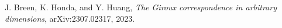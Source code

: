 \documentclass[11pt]{amsart}
\begin{document}
\begin{thebibliography}{}
\begin{comment}
\bibitem[BEHW03]{SFTCompactness}
F. Bourgeois, Y. Eliashberg, H. Hofer, and K. Wysocki, \textit{Compactness results in symplectic field theory}, Geom. Topol., Volume 7, Number 2, p.799-888, 2003.

\bibitem[BN10]{AlgebraicallyOvertwisted}
F. Bourgeois and K. Niederkr{\"u}ger, Towards a good definition of algebraically overtwisted,
Expo. Math. 28, no. 1, 85–100, 2010.

\bibitem[BO09a]{BO:MorseBott}
F. Bourgeois and A. Oancea, \textit{Symplectic homology, autonomous Hamiltonians, and Morse–Bott moduli spaces}, Duke Math. J. 146, p.71–174, 2009.

\bibitem[BO09b]{BO:ExactSequence}
F. Bourgeois and A. Oancea, \textit{An exact sequence for contact- and symplectic homology},
Invent. math., Volume 175, p. 611–680, 2009.

\bibitem[BT82]{BottTu}
R. Bott and L. R. Tu, \textit{Differential forms in algebraic topology}, Graduate Texts in Mathematics 82, Springer-Verlag, 1982.
\end{comment}

J. Breen, K. Honda, and Y. Huang, \textit{The Giroux correspondence in arbitrary dimensions}, arXiv:2307.02317, 2023.

\begin{comment}
\bibitem[CGKS14]{CGKS:Polyfilling}
C. Cao, N. Gallup, K. Hayden, J. M. Sabloff, \textit{Topologically Distinct Lagrangian and Symplectic Fillings}, Math. Research Letters, Vol. 21, p.85-99, 2014.

\begin{comment}
\bibitem[CMP19]{CMP:OT}
R. Casals, E. Murphy, and F. Presas, \textit{Geometric criteria for overtwistedness}, J. Amer. Math. Soc. 32, p.563–604, 2019.


\bibitem[CG86]{CG:Cobordisms}
A. Casson, C. M. Gordon, \textit{Cobordism of classical knots}, from: "{\'A} la recherche de la topologie perdue" (editors L Guillou, A Marin), Progr. Math. 62, Birkh{\"a}user 181, 1986.

\bibitem[CDGG20]{Cthulu}
B. Chantraine, G. Dimitroglou Rizell, P. Ghiggini, and R. Golovko, \textit{Floer theory for Lagrangian cobordisms}, J. Differential Geom. 114 no. 3, p.393–465, 2020.

\bibitem[Ch10]{Chantraine:Concordance}
B. Chantraine, \textit{Lagrangian concordance of Legendrian knots}, Algebr. Geom. Topol. 10, p.63-85, 2010.

\bibitem[Ch10]{Chantraine:Symmetric}
B. Chantraine, \textit{Lagrangian concordance is not a symetric relation}, Quantum Topol. Vol. 6,, p.451-474, 2015.


\end{comment}
\end{thebibliography}
\end{document}
